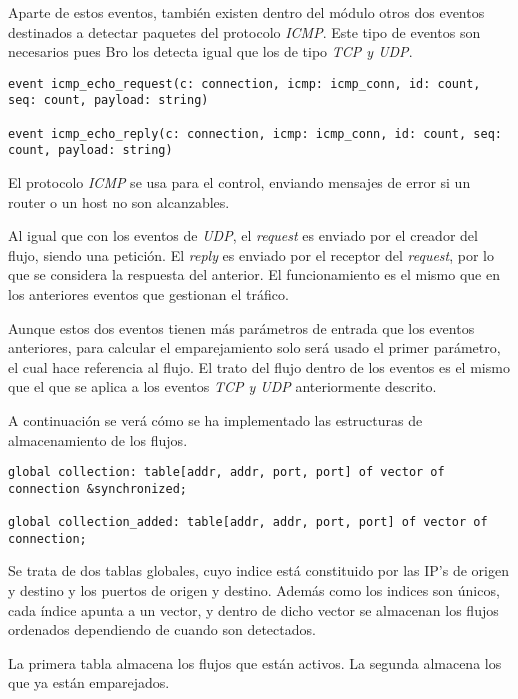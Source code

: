 \intro Aparte de estos eventos, también existen dentro del módulo otros dos eventos destinados a detectar 
paquetes del protocolo \textit{ICMP}. Este tipo de eventos son necesarios pues Bro los detecta igual que los 
de tipo \textit{TCP y UDP}.

\begin{lstlisting}[style=CodigoC]
event icmp_echo_request(c: connection, icmp: icmp_conn, id: count, seq: count, payload: string)

event icmp_echo_reply(c: connection, icmp: icmp_conn, id: count, seq: count, payload: string)
\end{lstlisting}

\intro El protocolo \textit{ICMP} se usa para el control, enviando mensajes de error si un router o un host 
no son alcanzables.

\intro Al igual que con los eventos de \textit{UDP}, el \textit{request} es enviado por el creador del flujo, 
siendo una petición. El \textit{reply} es enviado por el receptor del \textit{request}, por lo que se considera 
la respuesta del anterior. El funcionamiento es el mismo que en los anteriores eventos que gestionan el tráfico.

\intro Aunque estos dos eventos tienen más parámetros de entrada que los eventos anteriores, para calcular el 
emparejamiento solo será usado el primer parámetro, el cual hace referencia al flujo. El trato del flujo dentro 
de los eventos es el mismo que el que se aplica a los eventos \textit{TCP y UDP} anteriormente descrito.

\intro A continuación se verá cómo se ha implementado las estructuras de almacenamiento de los flujos.

\begin{lstlisting}[style=CodigoC]
global collection: table[addr, addr, port, port] of vector of connection &synchronized;

global collection_added: table[addr, addr, port, port] of vector of connection;
\end{lstlisting}

\intro Se trata de dos tablas globales, cuyo indice está constituido por las IP's de origen y destino y los 
puertos de origen y destino. Además como los indices son únicos, cada índice apunta a un vector, y dentro de 
dicho vector se almacenan los flujos ordenados dependiendo de cuando son detectados.

\intro La primera tabla almacena los flujos que están activos. La segunda almacena los que ya están emparejados.



